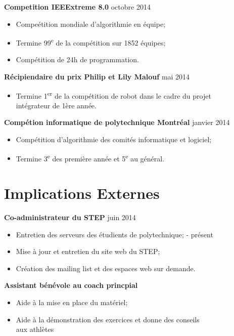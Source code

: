 \documentclass[margin]{res}
\begin{document}
\begin{resume}
  {\bf Competition IEEExtreme 8.0} \hfill octobre 2014
  \begin{itemize} \itemsep -2pt
  \item Compe\'etition mondiale d'algorithmie en \'equipe;
  \item Termine 99\textsuperscript{e} de la comp\'etition sur 1852 \'equipes;
  \item Comp\'etition de 24h de programmation.
  \end{itemize}
  
  {\bf R\'{e}cipiendaire du prix Philip et Lily Malouf} \hfill mai 2014
  \begin{itemize} \itemsep -2pt
  \item Termine 1\textsuperscript{er} de la comp\'{e}tition de robot dans le cadre du projet\\   int\'{e}grateur de 1\`{e}re ann\'{e}e.
  \end{itemize}
  
  {\bf Comp\'{e}tion informatique de polytechnique Montr\'{e}al} \hfill janvier 2014
  \begin{itemize} \itemsep -2pt
  \item Comp\'{e}tition d'algorithmie des comit\'{e}s informatique et logiciel;
  \item Termine 3\textsuperscript{e} des premi\`{e}re ann\'{e}e et 5\textsuperscript{e} au g\'{e}n\'{e}ral.
  \end{itemize}


  \section{Implications Externes}
  
  {\bf Co-administrateur du STEP} \hfill juin 2014
  \begin{itemize} \itemsep -2pt
  \item Entretien des serveurs des \'etudients de polytechnique; \hfill - pr\'esent
  \item Mise \`{a} jour et entretien du site web du STEP;
  \item Cr\'{e}ation des mailing list et des espaces web sur demande.
  \end{itemize}
  
  {\bf Assistant b\'{e}n\'{e}vole au coach princpial}
  \begin{itemize} \itemsep -2pt
  \item Aide \`{a} la mise en place du mat\'{e}riel;
  \item Aide \`{a} la d\'{e}monstration des exercices et donne des conseils\\ aux athl\`{e}tes
  \end{itemize}
  

\end{resume}
\end{document}
